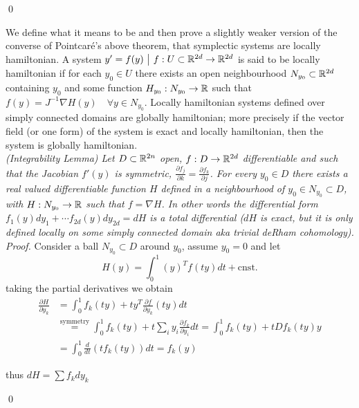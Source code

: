 \documentclass[12pt]{article}
\begin{document}
\qed

We define what it means to be  and then prove a slightly weaker version of the converse of Pointcar\'e's above theorem, that symplectic systems are locally hamiltonian. A system $y' = f(y) \,\,\big|\,\, f : U\subset\mathbb{R}^{2d} \to \mathbb{R}^{2d}$ is said to be locally hamiltonian if for each $y_0\in U$ there exists an open neighbourhood $N_{y_0}\subset \mathbb{R}^{2d}$ containing $y_0$ and some function $H_{y_0} : N_{y_0}\to \mathbb{R}$ such that $f(y) = J^{-1}\nabla H(y)\quad\forall y\in N_{y_0}$. Locally hamiltonian systems defined over simply connected domains are globally hamiltonian; more precisely if the vector field (or one form) of the system is exact and locally hamiltonian, then the  system is globally hamiltonian. \\

 \textit{(Integrability Lemma) \cite{Numerical} Let $D\subset \mathbb{R}^{2n}$ open, $f: D\to \mathbb{R}^{2d}$ differentiable and such that the Jacobian $f'(y)$ is symmetric, $\frac{\partial f_j}{\partial k} = \frac{\partial f_k}{\partial j}$. For every $y_0\in D$ there exists a real valued differentiable function $H$ defined in a neighbourhood of $y_0\in N_{y_0}\subset D$, with $H:N_{y_0}\to\mathbb{R}$ such that $f = \nabla H$. In other words the differential form $f_1(y)dy_1 + \cdots f_{2d}(y)dy_{2d} = dH$ is a total differential ($dH$ is exact, but it is only defined locally on some simply connected domain aka trivial deRham cohomology).} \\

\textit{Proof.} Consider a ball $N_{y_0}\subset D$ around $y_0$, assume $y_0=0$ and let 
$$
H(y) = \int_0^1 (y)^Tf(ty) dt + \text{cnst.}
$$
taking the partial derivatives we obtain
\begin{equation}\label{eq:hamiltonian differential}
\begin{split}
    \frac{\partial H}{\partial y_k} & = \int_0^1 f_k(ty) + t y^T\frac{\partial f}{\partial y_k}(ty) dt \\
    & \stackrel{\text{symmetry}}{=} \int_0^1 f_k(ty) + t\sum_i y_i\frac{\partial f_k}{\partial y_i} dt = \int_0^1 f_k(ty) + t D f_k(ty) y\\
    & = \int_0^1 \frac{d}{dt}\left( t f_k(ty) \right) dt = f_k(y)
\end{split}
\end{equation}

thus $dH = \sum f_k dy_k$

\qed
\end{document}
